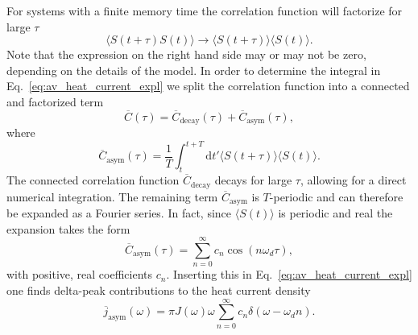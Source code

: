 \documentclass[aps,prb, twocolumn,superscriptaddress]{revtex4-2}
\newcommand{\diff}{\mathrm{d}}
\newcommand{\braket}[1]{\langle#1\rangle}
\begin{document}
For systems with a finite memory time the correlation function will factorize for large $\tau$
\begin{equation}
     \langle S(t+\tau)S(t)\rangle \rightarrow \langle S(t+\tau)\rangle \langle S(t)\rangle.
\end{equation}
Note that the expression on the right hand side may or may not be zero, depending on the details of the model. In order to determine the integral in Eq.~\eqref{eq:av_heat_current_expl} we split the correlation function into a connected and factorized term
\begin{equation}
    \overline{C}(\tau) = \overline{C}_\mathrm{decay}(\tau) + \overline{C}_\mathrm{asym}(\tau),
\end{equation}
where
\begin{equation}
    \overline{C}_\mathrm{asym}(\tau)=\frac{1}{T}\int_t^{t+T}\diff t' \langle S(t+\tau)\rangle \langle S(t)\rangle.
\end{equation}
The connected correlation function $\overline{C}_\mathrm{decay}$ decays for large $\tau$, allowing for a direct numerical integration. The remaining term $\overline C_\mathrm{asym}$ is $T$-periodic and can therefore be expanded as a Fourier series. In fact, since $\braket{S(t)}$ is periodic and real the expansion takes the form
\begin{equation} \label{fourier}
    \overline C_{\mathrm{asym}}(\tau) = \sum_{n=0}^\infty c_n\cos(n \omega_d \tau),
\end{equation}
with positive, real coefficients $c_n$.
Inserting this in Eq.~\eqref{eq:av_heat_current_expl} one finds delta-peak contributions to the heat current density
\begin{equation} \label{asym_hc}
\overline{j}_{\mathrm{asym}}(\omega) = \pi J(\omega)\omega \sum_{n=0}^\infty c_n  \delta(\omega - \omega_dn).
\end{equation}
\end{document}
